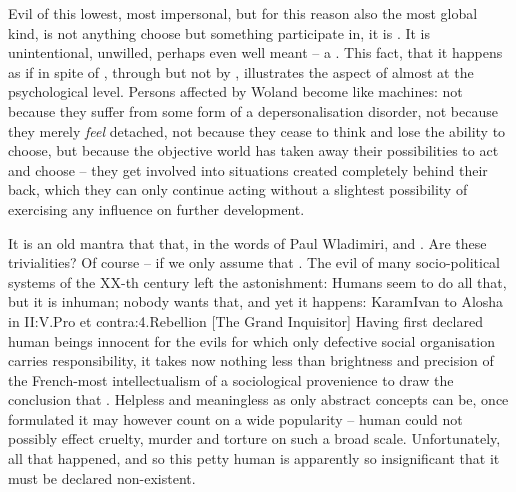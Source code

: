 \newp
\pa
Evil of this lowest, most impersonal, but for this reason also the most
global kind, is not anything  choose but something  participate in,
it is . It is unintentional, unwilled, perhaps even well
meant -- a . This fact, that
it happens as if in spite of , through  but 
not by , illustrates the aspect of  almost at the
psychological level. Persons affected by Woland become like machines: not
because they suffer from some form of a %
depersonalisation disorder, not because they merely {\em feel} detached, not 
because they cease to think and lose the ability to choose, but because the
objective world has taken away 
their possibilities to act and choose -- they get involved into situations created
completely behind their back, which they can only continue acting without
a slightest possibility of exercising any influence on further development.


It is an old mantra that 
that, in the words of Paul Wladimiri,  and .
Are these trivialities? Of course -- if we only assume that . The evil of many socio-political systems of the XX-th century left the
astonishment: 
Humans seem to do all that, but it is inhuman; nobody wants that, and yet it
happens: \citet{all I know is that there is suffering and that there is none
  guilty.}{Karam}{Ivan to Alosha in II:V.Pro et contra:4.Rebellion [The Grand
  Inquisitor]}
Having first declared human beings innocent for the evils for which only
defective social organisation carries responsibility, 
it takes now nothing less than brightness and precision of the French-most 
intellectualism of a sociological provenience to draw the conclusion that 
. Helpless and meaningless as only abstract
concepts can be, once formulated it may however count on a wide popularity
-- human  could not possibly effect cruelty, murder and torture on
such a broad scale.   Unfortunately, all that happened,
and so this petty human  is apparently so insignificant that it
must be declared non-existent.

